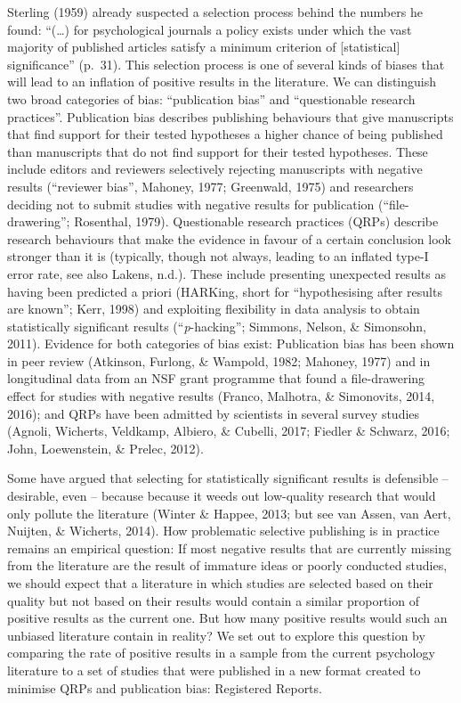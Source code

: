 \documentclass[british,,man,floatsintext]{apa6}
\begin{document}
Sterling (1959) already suspected a selection process behind the numbers he found:
\enquote{(\ldots{}) for psychological journals a policy exists under which the vast majority of published articles satisfy a minimum criterion of {[}statistical{]} significance} (p.~31).
This selection process is one of several kinds of biases that will lead to an inflation of positive results in the literature.
We can distinguish two broad categories of bias: \enquote{publication bias} and \enquote{questionable research practices}.
Publication bias describes publishing behaviours that give manuscripts that find support for their tested hypotheses a higher chance of being published than manuscripts that do not find support for their tested hypotheses.
These include editors and reviewers selectively rejecting manuscripts with negative results (``reviewer bias'', Mahoney, 1977; Greenwald, 1975) and researchers deciding not to submit studies with negative results for publication (``file-drawering''; Rosenthal, 1979).
Questionable research practices (QRPs) describe research behaviours that make the evidence in favour of a certain conclusion look stronger than it is (typically, though not always, leading to an inflated type-I error rate, see also Lakens, n.d.).
These include presenting unexpected results as having been predicted a priori (HARKing, short for ``hypothesising after results are known''; Kerr, 1998) and exploiting flexibility in data analysis to obtain statistically significant results (``\emph{p}-hacking''; Simmons, Nelson, \& Simonsohn, 2011).
Evidence for both categories of bias exist:
Publication bias has been shown in peer review (Atkinson, Furlong, \& Wampold, 1982; Mahoney, 1977) and in longitudinal data from an NSF grant programme that found a file-drawering effect for studies with negative results (Franco, Malhotra, \& Simonovits, 2014, 2016); and QRPs have been admitted by scientists in several survey studies (Agnoli, Wicherts, Veldkamp, Albiero, \& Cubelli, 2017; Fiedler \& Schwarz, 2016; John, Loewenstein, \& Prelec, 2012).

Some have argued that selecting for statistically significant results is defensible -- desirable, even -- because because it weeds out low-quality research that would only pollute the literature (Winter \& Happee, 2013; but see van Assen, van Aert, Nuijten, \& Wicherts, 2014).
How problematic selective publishing is in practice remains an empirical question:
If most negative results that are currently missing from the literature are the result of immature ideas or poorly conducted studies, we should expect that a literature in which studies are selected based on their quality but not based on their results would contain a similar proportion of positive results as the current one.
But how many positive results would such an unbiased literature contain in reality?
We set out to explore this question by comparing the rate of positive results in a sample from the current psychology literature to a set of studies that were published in a new format created to minimise QRPs and publication bias: Registered Reports.
\end{document}
